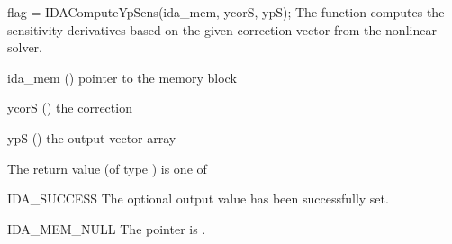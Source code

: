 {
  flag = IDAComputeYpSens(ida\_mem, ycorS, ypS);
}
{
  The function computes the sensitivity derivatives based on the
  given correction vector from the nonlinear solver.
}
{
  \begin{args}
    \item[ida\_mem] () pointer to the {\idas} memory block
    \item[ycorS] () the correction
    \item[ypS] () the output vector array
  \end{args}
}
{
  The return value  (of type ) is one of
  \begin{args}
  \item[IDA\_SUCCESS]
    The optional output value has been successfully set.
  \item[IDA\_MEM\_NULL]
    The  pointer is .
  \end{args}
}
{}





